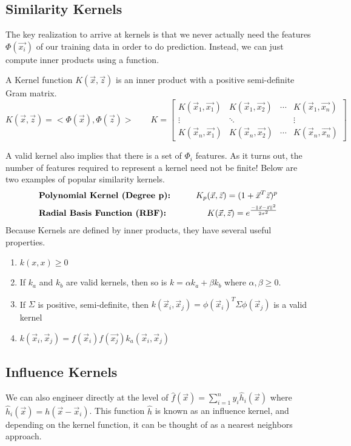 \subsection{Similarity Kernels}
The key realization to arrive at kernels is that we never actually need the features $\Phi(\vec{x_i})$ of our training data in order to do prediction. Instead, we can just compute inner products using a function.
\begin{definition}
  A Kernel function $K(\vec{x}, \vec{z})$ is an inner product with a positive semi-definite Gram matrix.
  \[
    K(\vec{x}, \vec{z}) = <\Phi(\vec{x}), \Phi(\vec{z})> \qquad K = \begin{bmatrix}
      K(\vec{x}_1, \vec{x_1}) &  K(\vec{x}_1, \vec{x_2}) &  \cdots & K(\vec{x}_1, \vec{x_n})\\
      \vdots & \ddots & & \vdots\\
      K(\vec{x}_n, \vec{x_1}) &  K(\vec{x}_n, \vec{x_2}) &  \cdots & K(\vec{x}_n, \vec{x_n})
    \end{bmatrix}
  \]
\end{definition}
A valid kernel also implies that there is a set of $\Phi_i$ features. As it turns out, the number of features required to represent a kernel need not be finite! Below are two examples of popular similarity kernels.
\begin{align*}
  &\textbf{Polynomial Kernel (Degree p):} &\qquad K_p(\vec{x},\vec{z}) = (1+\vec{x}^T\vec{z})^p\\
  &\textbf{Radial Basis Function (RBF):} &\qquad K(\vec{x}, \vec{z}) = e^{\frac{-\|\vec{x}-\vec{z}\|^2}{2\sigma^2}}
\end{align*}
Because Kernels are defined by inner products, they have several useful properties.
\begin{enumerate}
  \item $k(x, x) \geq 0$
  \item If $k_a$ and $k_b$ are valid kernels, then so is $k = \alpha k_a + \beta k_b$ where $\alpha, \beta \geq 0$.
  \item If $\Sigma$ is positive, semi-definite, then $k(\vec{x}_i, \vec{x}_j)=\phi(\vec{x}_i)^T\Sigma\phi(\vec{x}_j)$ is a valid kernel
  \item $k(\vec{x}_i, \vec{x}_j) = f(\vec{x}_i)f(\vec{x_j})k_a(\vec{x}_i, \vec{x}_j)$
\end{enumerate}
\subsection{Influence Kernels}
We can also engineer directly at the level of $\hat{f}(\vec{x})=\sum_{i=1}^ny_i\hat{h}_i(\vec{x})$ where $\hat{h}_i(\vec{x})=h(\vec{x}-\vec{x}_i)$.
This function $\hat{h}$ is known as an influence kernel, and depending on the kernel function, it can be thought of as a nearest neighbors approach.
